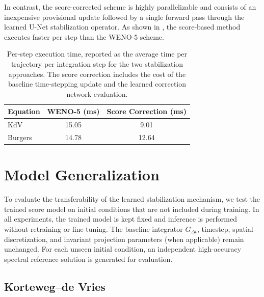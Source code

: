 \documentclass[letterpaper]{article} %
\begin{document}
In contrast, the score-corrected scheme is highly parallelizable and consists of an inexpensive provisional update followed by a single forward pass through the learned U-Net stabilization operator. As shown in , the score-based method executes faster per step than the WENO-5 scheme.

\begin{table}[htbp]
\centering
\caption{Per-step execution time, reported as the average time per trajectory per integration step for the two stabilization approaches. The score correction includes the cost of the baseline time-stepping update and the learned correction network evaluation.}
\label{tab:timing}
\begin{tabular}{l c c}
\toprule
Equation & WENO-5 (ms) & Score Correction (ms) \\
\midrule
KdV & 15.05 & 9.01 \\
Burgers & 14.78 & 12.64 \\
\bottomrule
\end{tabular}
\end{table}






\section{Model Generalization}
\label{app:generalization}

To evaluate the transferability of the learned stabilization mechanism, we test
the trained score model on initial conditions that are not included during
training. In all experiments, the trained model is kept fixed and inference is
performed without retraining or fine-tuning. The baseline integrator
$G_{\Delta t}$, timestep, spatial discretization, and invariant projection
parameters (when applicable) remain unchanged. For each unseen initial condition, an independent high-accuracy
spectral reference solution is generated for evaluation.

\subsection{Korteweg--de Vries}
\label{app:gen_kdv}
\end{document}
